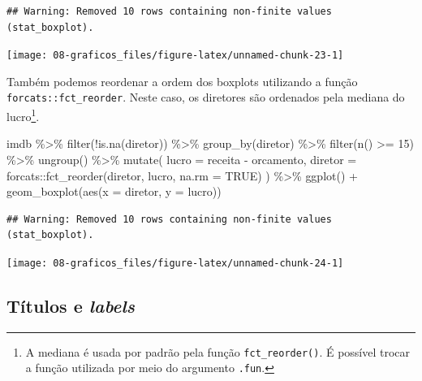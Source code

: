 \documentclass[
]{book}
\newenvironment{Shaded}{\begin{snugshade}}{\end{snugshade}}
\newcommand{\AttributeTok}[1]{\textcolor[rgb]{0.77,0.63,0.00}{#1}}
\newcommand{\ConstantTok}[1]{\textcolor[rgb]{0.00,0.00,0.00}{#1}}
\newcommand{\DecValTok}[1]{\textcolor[rgb]{0.00,0.00,0.81}{#1}}
\newcommand{\FunctionTok}[1]{\textcolor[rgb]{0.00,0.00,0.00}{#1}}
\newcommand{\NormalTok}[1]{#1}
\newcommand{\SpecialCharTok}[1]{\textcolor[rgb]{0.00,0.00,0.00}{#1}}
\begin{document}
\begin{verbatim}
## Warning: Removed 10 rows containing non-finite values (stat_boxplot).
\end{verbatim}

\begin{center}\texttt{[image: 08-graficos\_files/figure-latex/unnamed-chunk-23-1]} \end{center}

Também podemos reordenar a ordem dos boxplots utilizando a função \texttt{forcats::fct\_reorder}. Neste caso, os diretores são ordenados pela mediana do lucro\footnote{A mediana é usada por padrão pela função \texttt{fct\_reorder()}. É possível trocar a função utilizada por meio do argumento \texttt{.fun}.}.

\begin{Shaded}
\begin{Highlighting}[]
\NormalTok{imdb }\SpecialCharTok{\%\textgreater{}\%} 
  \FunctionTok{filter}\NormalTok{(}\SpecialCharTok{!}\FunctionTok{is.na}\NormalTok{(diretor)) }\SpecialCharTok{\%\textgreater{}\%}
  \FunctionTok{group\_by}\NormalTok{(diretor) }\SpecialCharTok{\%\textgreater{}\%} 
  \FunctionTok{filter}\NormalTok{(}\FunctionTok{n}\NormalTok{() }\SpecialCharTok{\textgreater{}=} \DecValTok{15}\NormalTok{) }\SpecialCharTok{\%\textgreater{}\%} 
  \FunctionTok{ungroup}\NormalTok{() }\SpecialCharTok{\%\textgreater{}\%} 
  \FunctionTok{mutate}\NormalTok{(}
    \AttributeTok{lucro =}\NormalTok{ receita }\SpecialCharTok{{-}}\NormalTok{ orcamento,}
    \AttributeTok{diretor =}\NormalTok{ forcats}\SpecialCharTok{::}\FunctionTok{fct\_reorder}\NormalTok{(diretor, lucro, }\AttributeTok{na.rm =} \ConstantTok{TRUE}\NormalTok{)}
\NormalTok{  ) }\SpecialCharTok{\%\textgreater{}\%} 
  \FunctionTok{ggplot}\NormalTok{() }\SpecialCharTok{+}
  \FunctionTok{geom\_boxplot}\NormalTok{(}\FunctionTok{aes}\NormalTok{(}\AttributeTok{x =}\NormalTok{ diretor, }\AttributeTok{y =}\NormalTok{ lucro))}
\end{Highlighting}
\end{Shaded}

\begin{verbatim}
## Warning: Removed 10 rows containing non-finite values (stat_boxplot).
\end{verbatim}

\begin{center}\texttt{[image: 08-graficos\_files/figure-latex/unnamed-chunk-24-1]} \end{center}

\hypertarget{tuxedtulos-e-labels}{%
\subsection{\texorpdfstring{Títulos e \emph{labels}}{Títulos e labels}}\label{tuxedtulos-e-labels}}
\end{document}
